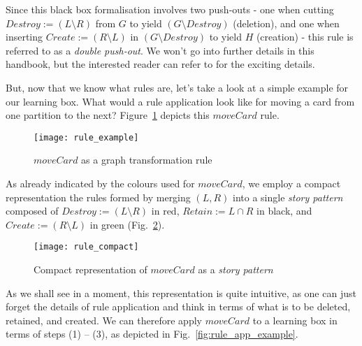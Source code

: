 Since this black box formalisation involves two push-outs - one when cutting $Destroy := (L\setminus R)$ from $G$ to yield $(G\setminus Destroy)$ (deletion),
and one when inserting $Create := (R\setminus L)$ in $(G\setminus Destroy)$ to yield $H$ (creation) - this rule is referred to as a \emph{double push-out}.
We won't go into further details in this handbook, but the interested reader can refer to \cite{EEPT06} for the exciting details.

But, now that we know what rules are, let's take a look at a simple example for our learning box. What would a rule application look like for moving a card from
one partition to the next? Figure~\ref{fig:rule_example} depicts this $moveCard$ rule.
  
\begin{figure}[htp]
\begin{center}
  \texttt{[image: rule\_example]}
  \caption[]{$moveCard$ as a graph transformation rule}	
  \label{fig:rule_example}
\end{center}
\end{figure}

\pagebreak

As already indicated by the colours used for $moveCard$, we employ a compact representation the rules formed by merging $(L,R)$ into a single
 \emph{story pattern} composed of  $Destroy := (L\setminus R)$ in red, $Retain :=  L\cap R$ in black, and $Create := (R\setminus L)$ in 
green (Fig.~\ref{fig:rule_compact}).

\begin{figure}[htp]
\begin{center}
  \texttt{[image: rule\_compact]}
  \caption[]{Compact representation of $moveCard$ as a \emph{story pattern}}
  \label{fig:rule_compact}
\end{center}
\end{figure}

As we shall see in a moment, this  representation is quite intuitive, as one can just forget the details of rule application and think in terms of what is to be
deleted, retained, and created. We can therefore apply $moveCard$ to a learning box in terms of steps (1) -- (3), as depicted in Fig.~\ref{fig:rule_app_example}.

